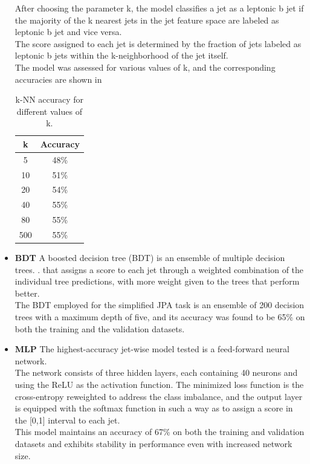 \begin{itemize}
    \begin{minipage}{\linewidth}
    \begin{minipage}{0.65\linewidth}
        After choosing the parameter k, the model classifies a jet as a leptonic b jet if the majority of the k nearest jets in the jet feature space are labeled as leptonic b jet and vice versa.\\
        The score assigned to each jet is determined by the fraction of jets labeled as leptonic b jets within the k-neighborhood of the jet itself.\\
        The model was assessed for various values of k, and the corresponding accuracies are shown in 
    \end{minipage}
    \hfill
        \begin{minipage}{0.3\linewidth}
        \begin{table}[H]
            \centering
             \fontsize{11.pt}{11.pt}\selectfont
            \begin{tabular}{c|c}
            \toprule
                \textbf{k} & \textbf{Accuracy} \\
                \midrule
                5 & 48\%\\
                10 & 51\%\\
                20 & 54\%\\
                40 & 55\%\\
                80 & 55\%\\
                500 & 55\%\\
            \end{tabular}
            \caption{k-NN accuracy for different values of k.}
            \label{tab:knn}
        \end{table}
        \end{minipage}
        \end{minipage}
    \item \textbf{BDT} A boosted decision tree (BDT) is an ensemble of multiple decision trees. \cite{Coadou2022BoostedTrees}. 
    that assigns a score to each jet through a weighted combination of the individual tree predictions, with more weight given to the trees that perform better.\\
    The BDT employed for the simplified JPA task is an ensemble of 200 decision trees with a maximum depth of five, and its accuracy was found to be 65\% on both the training and the validation datasets.
    \item \textbf{MLP} The highest-accuracy jet-wise model tested is a feed-forward neural network.\\
    The network consists of three hidden layers, each containing 40 neurons and using the ReLU as the activation function. The minimized loss function is the cross-entropy reweighted to address the class imbalance, and the output layer is equipped with the softmax function in such a way as to assign a score in the [0,1] interval to each jet.\\
    This model maintains an accuracy of 67\% on both the training and validation datasets and exhibits stability in performance even with increased network size.
\end{itemize}



